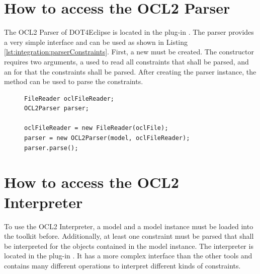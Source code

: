 \section{How to access the OCL2 Parser}

The \acs{OCL}2 Parser of \acl{DOT4Eclipse} is located in the plug-in . The parser provides a very simple interface and can be used as shown in Listing \ref{lst:integration:parserConstraints}. First, a new  must be created. The constructor requires two arguments, a  used to read all constraints that shall be parsed, and an  for that the constraints shall be parsed. After creating the parser instance, the method  can be used to parse the constraints.

\begin{figure}[!b]
\begin{lstlisting}[caption={How to parse constraints.}, captionpos=b, label=lst:integration:parserConstraints]
FileReader oclFileReader;
OCL2Parser parser;

oclFileReader = new FileReader(oclFile);
parser = new OCL2Parser(model, oclFileReader);	
parser.parse();
\end{lstlisting}
\end{figure}



\section{How to access the OCL2 Interpreter}

To use the \acs{OCL}2 Interpreter, a model and a model instance must be loaded into the toolkit before. Additionally, at least one constraint must be parsed that shall be interpreted for the objects contained in the model instance. The interpreter is located in the plug-in . It has a more complex interface than the other tools and contains many different operations to interpret different kinds of constraints.

